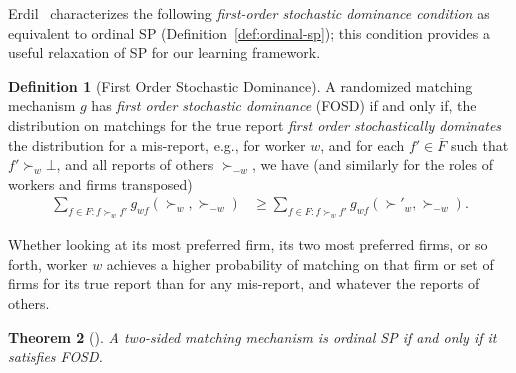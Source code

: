 \documentclass[11pt,letterpaper]{article}
\newtheorem{theorem}{Theorem}
\theoremstyle{definition}
\newtheorem{definition}[theorem]{Definition}
\newcommand{\kibitz}[2]{\ifnum\Comments=1{\color{#1}{#2}}\fi}
\newcommand{\dcp}[1]{\kibitz{orange}{[DCP: #1]}}
\newcommand{\todo}[1]{\kibitz{blue}{[TODO: #1]}}
\newcommand{\dcpadd}[1]{{#1}}
\begin{document}


Erdil~\cite{Erdil14} characterizes the following {\em first-order stochastic dominance condition} as equivalent to  ordinal SP (Definition~\ref{def:ordinal-sp}); this  condition provides a useful relaxation of SP for our learning framework.
\begin{definition}[First Order Stochastic Dominance]\label{def:fosd-sp}
 A randomized matching mechanism $g$ has {\em first order stochastic dominance}  (FOSD) if and only if, the distribution on matchings for the true report 
{\em first order stochastically dominates} the distribution for a mis-report, 
e.g., for worker $w$, and for each $f'\in \overline{F}$ such that $f' \succ_{w} \bot$, and all reports of others $\succ_{-w}$, we have (and similarly for the roles of workers and firms transposed)
%
\begin{align}
\sum_{f\in F: f\succ_w f'} g_{wf}(\succ_w, \succ_{-w}) & \geq \sum_{f\in F: f\succ_w f'} g_{wf}(\succ'_w, \succ_{-w}).
\end{align}
\end{definition}

\dcpadd{Whether looking at its most preferred firm, its two most preferred firms, or so forth,  worker $w$ achieves a higher probability of matching on that firm or set of firms for its true report than for any mis-report, and whatever the reports of others.}


\begin{theorem}[\cite{Erdil14}]\label{thm:fosd}
A two-sided matching  mechanism is ordinal  SP if and only if it satisfies FOSD.
\end{theorem}

 
\end{document}
